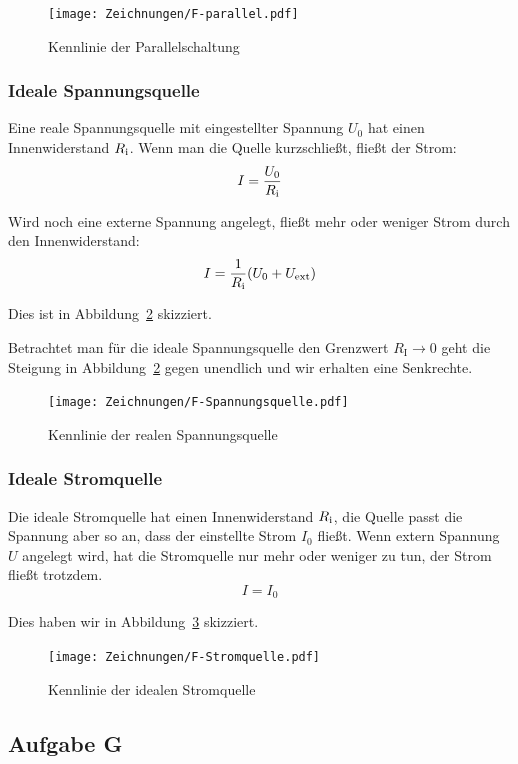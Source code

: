\begin{figure}[htbp]
	\centering
	\texttt{[image: Zeichnungen/F-parallel.pdf]}
	\caption{%
		Kennlinie der Parallelschaltung
	}
	\label{fig:F-parallel}
\end{figure}

\FloatBarrier
\subsubsection{Ideale Spannungsquelle}

Eine reale Spannungsquelle mit eingestellter Spannung $U_0$ hat einen
Innenwiderstand $R_\text i$. Wenn man die Quelle kurzschließt, fließt der
Strom:
\[
	I = \frac{U_0}{R_\text i}
\]

Wird noch eine externe Spannung angelegt, fließt mehr oder weniger Strom durch
den Innenwiderstand:
\[
	I = \frac{1}{R_\text i} (U_0 + U_\text{ext})
\]

Dies ist in Abbildung~\ref{fig:F-Spannungsquelle} skizziert.

Betrachtet man für die ideale Spannungsquelle den Grenzwert $R_\text{I}\to0$
geht die Steigung in Abbildung~\ref{fig:F-Spannungsquelle} gegen unendlich und
wir erhalten eine Senkrechte.

\begin{figure}[htbp]
	\centering
	\texttt{[image: Zeichnungen/F-Spannungsquelle.pdf]}
	\caption{%
		Kennlinie der realen Spannungsquelle
	}
	\label{fig:F-Spannungsquelle}
\end{figure}

\FloatBarrier
\subsubsection{Ideale Stromquelle}

Die ideale Stromquelle hat einen Innenwiderstand $R_\text i$, die Quelle passt
die Spannung aber so an, dass der einstellte Strom $I_0$ fließt. Wenn extern
Spannung $U$ angelegt wird, hat die Stromquelle nur mehr oder weniger zu tun,
der Strom fließt trotzdem.
\[
	I = I_0
\]

Dies haben wir in Abbildung~\ref{fig:F-Stromquelle} skizziert.

\begin{figure}[htbp]
	\centering
	\texttt{[image: Zeichnungen/F-Stromquelle.pdf]}
	\caption{%
		Kennlinie der idealen Stromquelle
	}
	\label{fig:F-Stromquelle}
\end{figure}

\FloatBarrier
\subsection{Aufgabe G}

